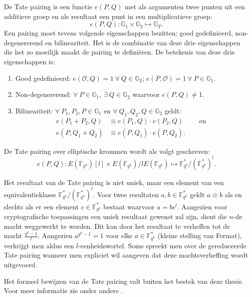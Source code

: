 De Tate pairing is een functie $e(P, Q)$ met als argumenten twee punten uit een additieve groep en als resultaat een punt in een multiplicatieve groep:
\[e(P, Q): \mathbb{G}_1 \times \mathbb{G}_2 \mapsto \mathbb{G}_T.\]
Een pairing moet tevens volgende eigenschappen bezitten: goed gedefinieerd, non-degenererend en bilineariteit. Het is de combinatie van deze drie eigenschappen die het zo moeilijk maakt de pairing te defini\"eren. De betekenis van deze drie eigenschappen is:
\begin{enumerate}
	\item Goed gedefinieerd: $e(\mathcal{O}, Q) = 1 \: \forall \: Q \in \mathbb{G}_2$; $e(P, \mathcal{O}) = 1 \: \forall \: P \in \mathbb{G}_1$.
	
	\item Non-degenererend: $\forall \: P \in \mathbb{G}_1, \: \exists \: Q \in \mathbb{G}_2$ waarvoor $e(P, Q) \neq 1$.
	
	\item Bilineariteit: $\forall \: P_1, P_2, P \in \mathbb{G}_1$ en $\forall \: Q_1, Q_2, Q \in \mathbb{G}_2$ geldt:
		\[\begin{aligned}
			e(P_1 + P_2, Q) &\equiv e(P_1, Q) \cdot e(P_2, Q) \qquad \text{ en }\\
			e(P, Q_1 + Q_2) &\equiv e(P, Q_1) \cdot e(P, Q_2).
		\end{aligned}\]
\end{enumerate}

De Tate pairing over elliptische krommen wordt als volgt geschreven:
\[e(P, Q): E(\mathbb{F}_{q^k})[l] \times E(\mathbb{F}_{q^k})/l E(\mathbb{F}_{q^k}) \mapsto \mathbb{F}_{q^k}^* / (\mathbb{F}_{q^k}^*)^l.\]

Het resultaat van de Tate pairing is niet uniek, maar een element van een equivalentieklasse $\mathbb{F}_{q^k}^* / (\mathbb{F}_{q^k}^*)^l$. Voor twee resultaten $a, b \in \mathbb{F}_{q^k}^*$ geldt $a \equiv b$ als en slechts als er een element $c \in \mathbb{F}_{q^k}^*$ bestaat waarvoor $a = bc^l$. Aangezien voor cryptografische toepassingen een uniek resultaat gewenst zal zijn, dient die $n$-de macht weggewerkt te worden. Dit kan door het resultaat te verheffen tot de macht $\frac{q^k - 1 }{l}$. Aangezien $a^{q^k - 1} = 1$ voor elke $a \in \mathbb{F}_{q^k}^*$ (kleine stelling van Fermat), verkrijgt men aldus een $l$-eenheidswortel. Soms spreekt men over de gereduceerde Tate pairing wanneer men expliciet wil aangeven dat deze machtsverheffing wordt uitgevoerd.

Het formeel bewijzen van de Tate pairing valt buiten het bestek van deze thesis. Voor meer informatie zie onder andere \cite{maas, ruck, hess}.

